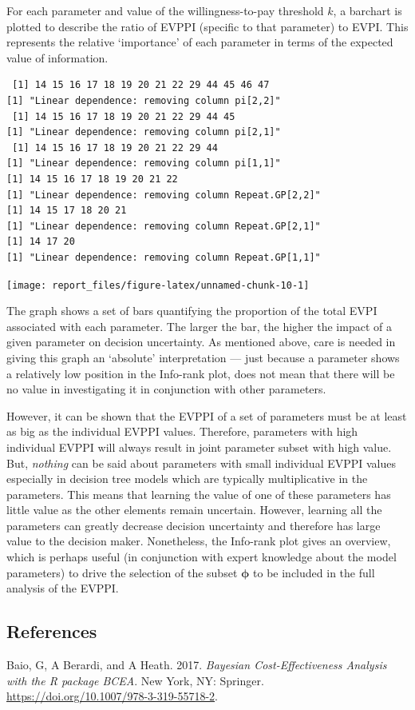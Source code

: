 \documentclass[]{article}
\begin{document}
For each parameter and value of the willingness-to-pay threshold \(k\),
a barchart is plotted to describe the ratio of EVPPI (specific to that
parameter) to EVPI. This represents the relative `importance' of each
parameter in terms of the expected value of information.

\begin{verbatim}
 [1] 14 15 16 17 18 19 20 21 22 29 44 45 46 47
[1] "Linear dependence: removing column pi[2,2]"
 [1] 14 15 16 17 18 19 20 21 22 29 44 45
[1] "Linear dependence: removing column pi[2,1]"
 [1] 14 15 16 17 18 19 20 21 22 29 44
[1] "Linear dependence: removing column pi[1,1]"
[1] 14 15 16 17 18 19 20 21 22
[1] "Linear dependence: removing column Repeat.GP[2,2]"
[1] 14 15 17 18 20 21
[1] "Linear dependence: removing column Repeat.GP[2,1]"
[1] 14 17 20
[1] "Linear dependence: removing column Repeat.GP[1,1]"
\end{verbatim}

\begin{center}\texttt{[image: report\_files/figure-latex/unnamed-chunk-10-1]} \end{center}

The graph shows a set of bars quantifying the proportion of the total
EVPI associated with each parameter. The larger the bar, the higher the
impact of a given parameter on decision uncertainty. As mentioned above,
care is needed in giving this graph an `absolute' interpretation ---
just because a parameter shows a relatively low position in the
Info-rank plot, does not mean that there will be no value in
investigating it in conjunction with other parameters.

However, it can be shown that the EVPPI of a set of parameters must be
at least as big as the individual EVPPI values. Therefore, parameters
with high individual EVPPI will always result in joint parameter subset
with high value. But, \emph{nothing} can be said about parameters with
small individual EVPPI values especially in decision tree models which
are typically multiplicative in the parameters. This means that learning
the value of one of these parameters has little value as the other
elements remain uncertain. However, learning all the parameters can
greatly decrease decision uncertainty and therefore has large value to
the decision maker. Nonetheless, the Info-rank plot gives an overview,
which is perhaps useful (in conjunction with expert knowledge about the
model parameters) to drive the selection of the subset \(\bm\phi\) to be
included in the full analysis of the EVPPI.

\hypertarget{references}{%
\subsection*{References}\label{references}}

\hypertarget{refs}{}
\leavevmode\hypertarget{ref-Baioetal:2017}{}%
Baio, G, A Berardi, and A Heath. 2017. \emph{Bayesian Cost-Effectiveness
Analysis with the R package BCEA}. New York, NY: Springer.
\url{https://doi.org/10.1007/978-3-319-55718-2}.
\end{document}

